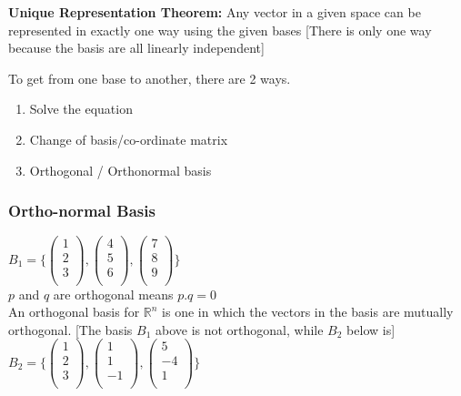 \documentclass[11pt]{article}
\theoremstyle{definition}
\newcommand{\R}{\mathbb{R}}
\begin{document}
\textbf{Unique Representation Theorem:} Any vector in a given space can be represented in exactly one way using the given bases [There is only one way because the basis are all linearly independent]


To get from one base to another, there are 2 ways. 
\begin{enumerate}[topsep=-10pt,itemsep=-5pt]
    \item Solve the equation
    \item Change of basis/co-ordinate matrix
    \item Orthogonal / Orthonormal basis
\end{enumerate}  
\subsubsection{Ortho-normal Basis}

$B_1 = \{
\begin{pmatrix}
1\\
2\\
3\\
\end{pmatrix}, \begin{pmatrix}
4\\
5\\
6\\
\end{pmatrix}, \begin{pmatrix}
7\\
8\\
9\\
\end{pmatrix}\}$\\
$p$ and $q$ are orthogonal means $p . q = 0$\\
An orthogonal basis for $\R^n$ is one in which the vectors in the basis are mutually orthogonal. [The basis $B_1$ above is not orthogonal, while $B_2$ below is]\
$B_2 = \{
\begin{pmatrix}
1\\
2\\
3\\
\end{pmatrix}, \begin{pmatrix}
1\\
1\\
-1\\
\end{pmatrix}, \begin{pmatrix}
5\\
-4\\
1\\
\end{pmatrix}\}$\\
\end{document}

